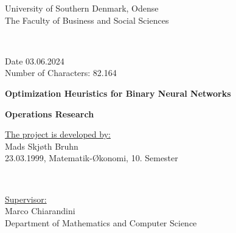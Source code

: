 \begin{titlepage}
	\hspace*{-1cm}
	\begin{minipage}[t][5cm][t]{0,6\textwidth}
	\begin{flushleft}
	University of Southern Denmark, Odense
	\\
	The Faculty of Business and Social Sciences
	\end{flushleft}
	\end{minipage}
	~
	\begin{minipage}[t][5cm][t]{0,5\textwidth}
	\begin{flushright}
	Date 03.06.2024
	\\
	Number of Characters: 82.164
	\end{flushright}
	\end{minipage}

\vfill
	\begin{center}
	\huge\bfseries Optimization Heuristics for Binary Neural Networks
	\end{center}
	\begin{center}
	\huge\bfseries Operations Research
	\end{center}
	\vfill

	\hspace*{-1cm}
	\begin{minipage}[b][5cm][b]{0,6\textwidth}
	\begin{flushleft}
	\uline{The project is developed by:}
	\\
	Mads Skjøth Bruhn 
	\\
	23.03.1999, Matematik-Økonomi, 10. Semester
	\end{flushleft}
	\end{minipage}
	~
	\begin{minipage}[b][5cm][b]{0,4\textwidth}
	\begin{flushright}
	
	\uline{Supervisor:}
	\\
	Marco Chiarandini
	\\
	Department of Mathematics and Computer Science
	\end{flushright}
	\end{minipage}
\end{titlepage}
